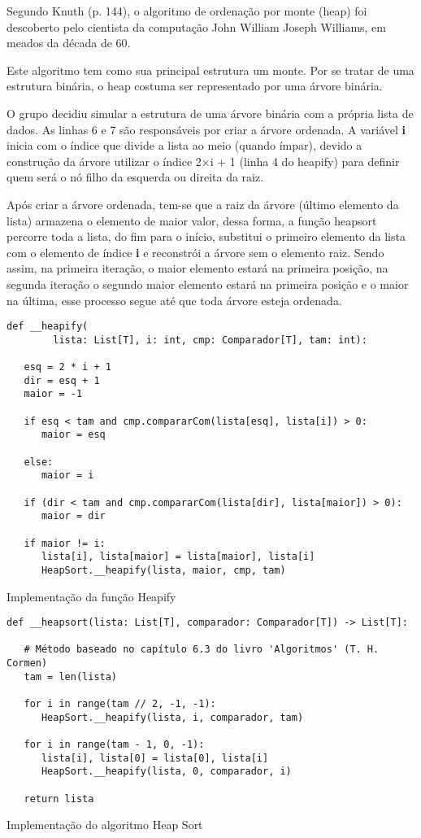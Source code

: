 \documentclass[a4paper,12pt]{scrartcl}
\begin{document}
Segundo Knuth (p. 144), o algoritmo de ordenação por monte (heap) foi descoberto pelo cientista da computação John William Joseph Williams, em meados da década de 60.

Este algoritmo tem como sua principal estrutura um monte. Por se tratar de uma estrutura binária, o heap costuma ser representado por uma árvore binária.

O grupo decidiu simular a estrutura de uma árvore binária com a própria lista de dados. As linhas 6 e 7 são responsáveis por criar a árvore ordenada. A variável \textbf{i} inicia com o índice que divide a lista ao meio (quando ímpar), devido a construção da árvore utilizar o índice 2$\times{}$i + 1 (linha 4 do heapify) para definir quem será o nó filho da esquerda ou direita da raiz. 

Após criar a árvore ordenada, tem-se que a raiz da árvore (último elemento da lista) armazena o elemento de maior valor, dessa forma, a função heapsort percorre toda a lista, do fim para o início, substitui o primeiro elemento da lista com o elemento de índice \textbf{i} e reconstrói a árvore sem o elemento raiz. Sendo assim, na primeira iteração, o maior elemento estará na primeira posição, na segunda iteração o segundo maior elemento estará na primeira posição e o maior na última, esse processo segue até que toda árvore esteja ordenada.

\begin{listing}[H]
\begin{verbatim}
def __heapify(
        lista: List[T], i: int, cmp: Comparador[T], tam: int):

   esq = 2 * i + 1
   dir = esq + 1
   maior = -1

   if esq < tam and cmp.compararCom(lista[esq], lista[i]) > 0:
      maior = esq

   else:
      maior = i

   if (dir < tam and cmp.compararCom(lista[dir], lista[maior]) > 0):
      maior = dir

   if maior != i:
      lista[i], lista[maior] = lista[maior], lista[i]
      HeapSort.__heapify(lista, maior, cmp, tam)

\end{verbatim}
\caption{\footnotesize{Implementação da função Heapify}}
\end{listing}

\begin{listing}[H]
\begin{verbatim}
def __heapsort(lista: List[T], comparador: Comparador[T]) -> List[T]:

   # Método baseado no capítulo 6.3 do livro 'Algoritmos' (T. H. Cormen)
   tam = len(lista)

   for i in range(tam // 2, -1, -1):
      HeapSort.__heapify(lista, i, comparador, tam)

   for i in range(tam - 1, 0, -1):
      lista[i], lista[0] = lista[0], lista[i]
      HeapSort.__heapify(lista, 0, comparador, i)

   return lista
\end{verbatim}
\caption{\footnotesize{Implementação do algoritmo Heap Sort}}
\end{listing}
\end{document}
